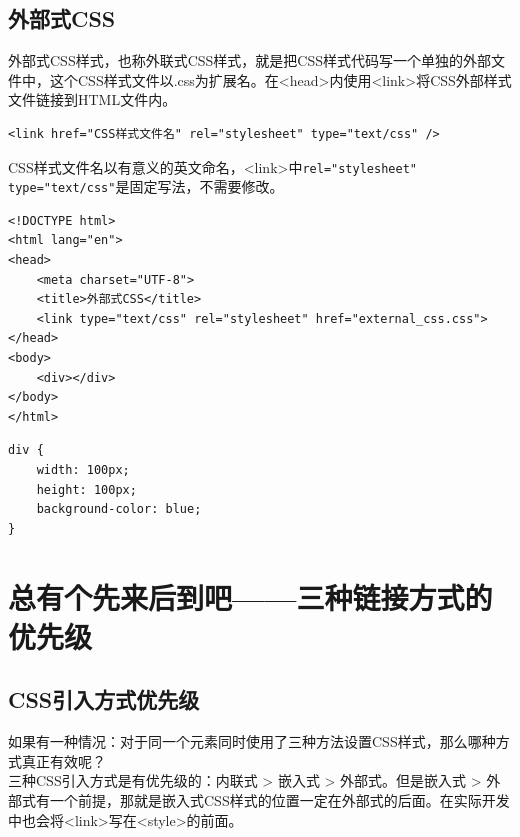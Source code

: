 \subsection{外部式CSS}

外部式CSS样式，也称外联式CSS样式，就是把CSS样式代码写一个单独的外部文件中，这个CSS样式文件以.css为扩展名。在<head>内使用<link>将CSS外部样式文件链接到HTML文件内。 \\

\begin{lstlisting}[style=htmlcssjs]
<link href="CSS样式文件名" rel="stylesheet" type="text/css" />
\end{lstlisting}

CSS样式文件名以有意义的英文命名，<link>中\lstinline|rel="stylesheet" type="text/css"|是固定写法，不需要修改。 \\


\begin{lstlisting}[style=htmlcssjs, title=external\_css.html]
<!DOCTYPE html>
<html lang="en">
<head>
    <meta charset="UTF-8">
    <title>外部式CSS</title>
    <link type="text/css" rel="stylesheet" href="external_css.css">
</head>
<body>
    <div></div>
</body>
</html>
\end{lstlisting}

\begin{lstlisting}[style=htmlcssjs, title=external\_css.css]
div {
    width: 100px;
    height: 100px;
    background-color: blue;
}
\end{lstlisting}

\newpage

\section{总有个先来后到吧——三种链接方式的优先级}

\subsection{CSS引入方式优先级}

如果有一种情况：对于同一个元素同时使用了三种方法设置CSS样式，那么哪种方式真正有效呢？ \\

三种CSS引入方式是有优先级的：内联式 > 嵌入式 > 外部式。但是嵌入式 > 外部式有一个前提，那就是嵌入式CSS样式的位置一定在外部式的后面。在实际开发中也会将<link>写在<style>的前面。 \\

